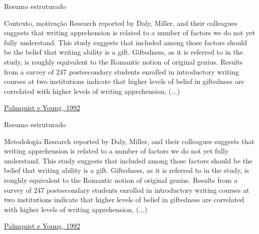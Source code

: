 \documentclass{beamer}
\begin{document}
\begin{frame}{Resumo estruturado}
  \begin{exampleblock}{Contexto, motivação}
    \scriptsize
    \alert{Research reported by Daly, Miller, and their colleagues
      suggests that writing apprehension is related to a number of
      factors we do not yet fully understand. This study suggests that
      included among those factors should be the belief that writing
      ability is a gift. Giftedness, as it is referred to in the
      study, is roughly equivalent to the Romantic notion of original
      genius.} Results from a survey of 247 postsecondary students
    enrolled in introductory writing courses at two institutions
    indicate that higher levels of belief in giftedness are correlated
    with higher levels of writing apprehension, (...)
  \end{exampleblock}

  \vfill
  \scriptsize
  \hfill \href{https://doi.org/10.1177/0741088392009001004}{Palmquist e Young, 1992}
\end{frame}

\begin{frame}{Resumo estruturado}
  \begin{exampleblock}{Metodologia}
    \scriptsize
    Research reported by Daly, Miller, and their colleagues suggests
    that writing apprehension is related to a number of factors we do
    not yet fully understand. This study suggests that included among
    those factors should be the belief that writing ability is a
    gift. Giftedness, as it is referred to in the study, is roughly
    equivalent to the Romantic notion of original genius. Results from
    \alert{a survey of 247 postsecondary students enrolled in
      introductory writing courses at two institutions} indicate that
    higher levels of belief in giftedness are correlated with higher
    levels of writing apprehension, (...)
  \end{exampleblock}

  \vfill
  \scriptsize
  \hfill \href{https://doi.org/10.1177/0741088392009001004}{Palmquist e Young, 1992}
\end{frame}
\end{document}
